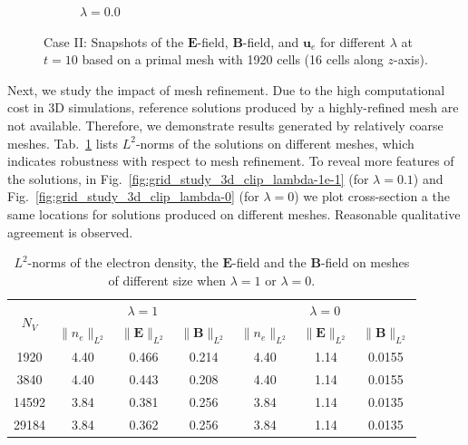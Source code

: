 \documentclass{article}
\begin{document}
\begin{figure}
\begin{subfigure}[b]{\textwidth}
        \caption{\colorbox{yellow!30}{$\lambda = 0.0$}}
    \end{subfigure}
    \caption{Case II: Snapshots of the $\mathbf{E}$-field, $\mathbf{B}$-field, and $\mathbf{u}_e$ for different $\lambda$ at $t = 10$ based on a primal mesh with 1920 cells (16 cells along $z$-axis). } 
    \label{fig:3d_vec_field_E_B_ue}
\end{figure}

Next, we study the impact of mesh refinement. Due to the high computational cost in 3D
simulations, reference solutions produced by a highly-refined mesh are not
available. Therefore, we demonstrate results generated by relatively coarse
meshes. Tab.~\ref{tab:grid_study_norm} lists $L^2$-norms of the solutions on different
meshes, which indicates robustness with respect to mesh refinement. To reveal more
features of the solutions, in Fig.~\ref{fig:grid_study_3d_clip_lambda-1e-1} (for
$\lambda = 0.1$) and Fig.~\ref{fig:grid_study_3d_clip_lambda-0} (for $\lambda = 0$) we plot
cross-section a the same locations for solutions produced on different meshes. Reasonable
qualitative agreement is observed. 

\begin{table}[]
    \centering
    \begin{tabular}{c | c c c | c c c}
        \hline\hline
        \multirow{2}{1em}{$N_V$} & \multicolumn{3}{c|}{\colorbox{yellow!30}{$\lambda = 1$}}
        &
        \multicolumn{3}{c}{\colorbox{yellow!30}{$\lambda = 0$}} \\
        \cline{2-4} \cline{5-7}
        & $\|n_e \|_{L^2}$ & $\|\mathbf{E} \|_{L^2}$ & $\|\mathbf{B} \|_{L^2}$ & $\|n_e
        \|_{L^2}$
        & $\|\mathbf{E} \|_{L^2}$ & $\|\mathbf{B} \|_{L^2}$  \\
        \hline
         1920  &  4.40 & 0.466 & 0.214 & 4.40 & 1.14 & 0.0155 \\
         3840  &  4.40 & 0.443 & 0.208 & 4.40 & 1.14 & 0.0155 \\
         14592 &  3.84 & 0.381 & 0.256 & 3.84 & 1.14 & 0.0135 \\ 
         29184 &  3.84 & 0.362 & 0.256 & 3.84 & 1.14 & 0.0135 \\
         \hline\hline
    \end{tabular}
    \caption{$L^2$-norms of the electron density, the $\mathbf{E}$-field and the
      $\mathbf{B}$-field on meshes of different size when
      \colorbox{yellow!30}{$\lambda = 1$} or $\lambda = 0$.}
    \label{tab:grid_study_norm}
\end{table}
\end{document}
